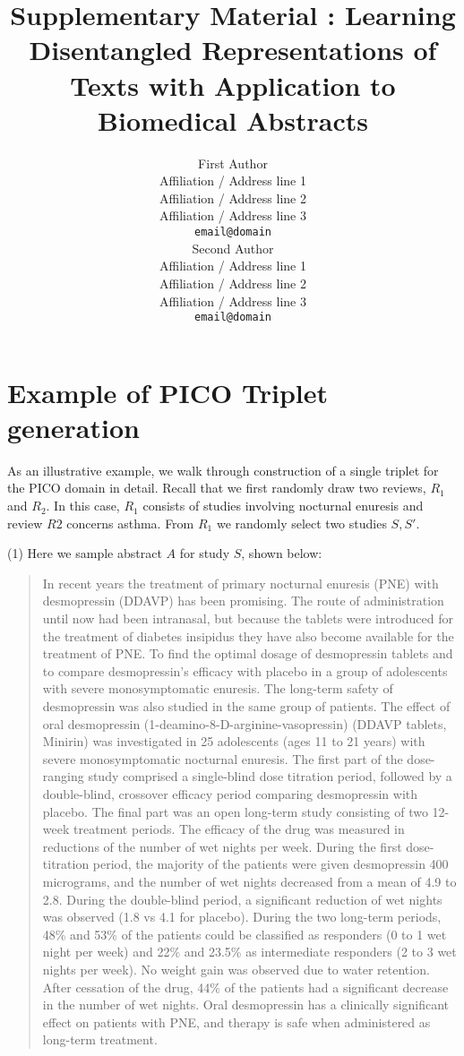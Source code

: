 \documentclass[11pt,a4paper]{article}
\title{Supplementary Material : Learning Disentangled Representations of Texts with Application to Biomedical Abstracts}
\author{First Author \\
  Affiliation / Address line 1 \\
  Affiliation / Address line 2 \\
  Affiliation / Address line 3 \\
  {\tt email@domain} \\\And
  Second Author \\
  Affiliation / Address line 1 \\
  Affiliation / Address line 2 \\
  Affiliation / Address line 3 \\
  {\tt email@domain} \\}
\date{}
\begin{document}
\maketitle

\appendix
\section{Example of PICO Triplet generation}
As an illustrative example, we walk through construction of a single triplet for the PICO domain in detail. Recall that we first randomly draw two reviews, $R_1$ and $R_2$. In this case, $R_1$ consists of studies involving nocturnal enuresis and review $R2$ concerns asthma. From $R_1$ we randomly select two studies $S, S'$. 

(1) Here we sample abstract $A$ for study $S$, shown below:

{\footnotesize \begin{quote}
In recent years the treatment of primary nocturnal enuresis (PNE) with desmopressin (DDAVP) has been promising. The route of administration until now had been intranasal, but because the tablets were introduced for the treatment of diabetes insipidus they have also become available for the treatment of PNE. To find the optimal dosage of desmopressin tablets and to compare desmopressin's efficacy with placebo in a group of adolescents with severe monosymptomatic enuresis. The long-term safety of desmopressin was also studied in the same group of patients. The effect of oral desmopressin (1-deamino-8-D-arginine-vasopressin) (DDAVP tablets, Minirin) was investigated in 25 adolescents (ages 11 to 21 years) with severe monosymptomatic nocturnal enuresis. The first part of the dose-ranging study comprised a single-blind dose titration period, followed by a double-blind, crossover efficacy period comparing desmopressin with placebo. The final part was an open long-term study consisting of two 12-week treatment periods. The efficacy of the drug was measured in reductions of the number of wet nights per week. During the first dose-titration period, the majority of the patients were given desmopressin 400 micrograms, and the number of wet nights decreased from a mean of 4.9 to 2.8. During the double-blind period, a significant reduction of wet nights was observed (1.8 vs 4.1 for placebo). During the two long-term periods, 48\% and 53\% of the patients could be classified as responders (0 to 1 wet night per week) and 22\% and 23.5\% as intermediate responders (2 to 3 wet nights per week). No weight gain was observed due to water retention. After cessation of the drug, 44\% of the patients had a significant decrease in the number of wet nights. Oral desmopressin has a clinically significant effect on patients with PNE, and therapy is safe when administered as long-term treatment. \end{quote}}
\end{document}
